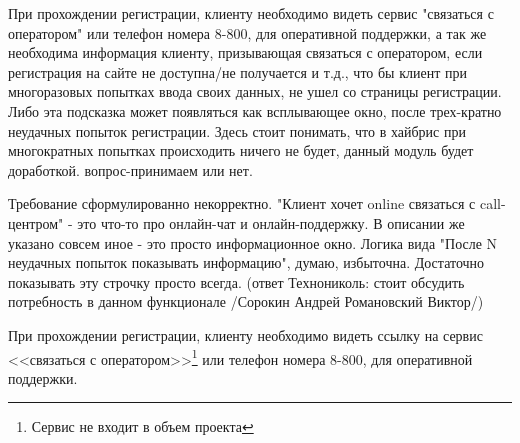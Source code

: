 {


\begin{wiki}
При прохождении регистрации, клиенту необходимо видеть сервис "связаться с оператором" или телефон номера 8-800, для оперативной поддержки, а так же необходима информация клиенту, призывающая связаться с оператором, если регистрация на сайте не доступна/не получается и т.д., что бы клиент при многоразовых попытках ввода своих данных, не ушел со страницы регистрации. Либо эта подсказка может появляться как всплывающее окно, после трех-кратно неудачных попыток регистрации. Здесь стоит понимать, что в хайбрис при многократных попытках происходить ничего не будет, данный модуль будет доработкой. вопрос-принимаем или нет. 
\end{wiki}

\begin{teamidea}
Требование сформулированно некорректно. "Клиент хочет online связаться с call-центром" - это что-то про онлайн-чат и онлайн-поддержку. В описании же указано совсем иное - это просто информационное окно.
Логика вида "После N неудачных попыток показывать информацию", думаю, избыточна. Достаточно показывать эту строчку просто всегда.
(ответ Технониколь: стоит обсудить потребность в данном функционале /Сорокин Андрей Романовский Виктор/)
\end{teamidea}


\begin{itogo}
 При прохождении регистрации, клиенту необходимо видеть ссылку на сервис <<связаться с оператором>>\footnote{Сервис не входит в объем проекта} или телефон номера 8-800, для оперативной поддержки.
\end{itogo}
}

